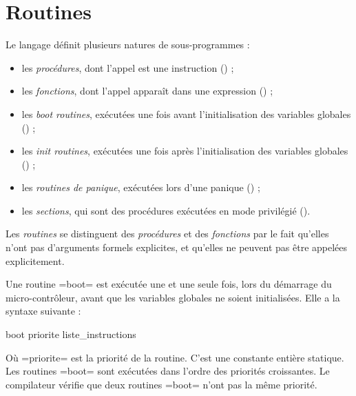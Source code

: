 




\chapter{Routines}

Le langage définit plusieurs natures de sous-programmes :
\begin{itemize}
  \item les \emph{procédures}, dont l'appel est une instruction () ;
  \item les \emph{fonctions}, dont l'appel apparaît dans une expression () ;
  \item les \emph{boot routines}, exécutées une fois avant l'initialisation des variables globales () ;
  \item les \emph{init routines}, exécutées une fois après l'initialisation des variables globales () ;
  \item les \emph{routines de panique}, exécutées lors d'une panique () ;
  \item les \emph{sections}, qui sont des procédures exécutées en mode privilégié ().
\end{itemize}

Les \emph{routines} se distinguent des \emph{procédures} et des \emph{fonctions} par le fait qu'elles n'ont pas d'arguments formels explicites, et qu'elles ne peuvent pas être appelées explicitement.










Une routine \plm=boot= est exécutée une et une seule fois, lors du démarrage du micro-contrôleur, avant que les variables globales ne soient initialisées. Elle a la syntaxe suivante :
\begin{PLM}
boot priorite {
  liste_instructions
}
\end{PLM}
Où \plm=priorite= est la priorité de la routine. C'est une constante entière statique. Les routines \plm=boot= sont exécutées dans l'ordre des priorités croissantes. Le compilateur vérifie que deux routines \plm=boot= n'ont pas la même priorité.

